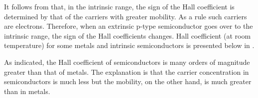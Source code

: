\noindent
It follows from  that, in the intrinsic range, the sign of the Hall coefficient is determined by that of the carriers with greater mobility. As a rule such carriers are electrons. Therefore, when an extrinsic p-type semiconductor goes over to the intrinsic range, the sign of the Hall coefficients changes. Hall coefficient (at room temperature) for some metals and intrinsic semiconductors is presented below in .

As indicated, the Hall coefficient of semiconductors is many
orders of magnitude greater than that of metals. The explanation
is that the carrier concentration in semiconductors is much less
but the mobility, on the other hand, is much greater than in metals.

\bigskip
\bigskip

\begin{table}[h]
	\renewcommand{\arraystretch}{1.2}
	\caption{}
	\vspace{-0.6cm}
	\label{table:9_2}
	\begin{center}\end{center}
\end{table}

\begin{table}[h]
	\renewcommand{\arraystretch}{1.2}
	\caption{}
	\vspace{-0.6cm}
	\label{table:9_3}
	\begin{center}\end{center}
\end{table}

